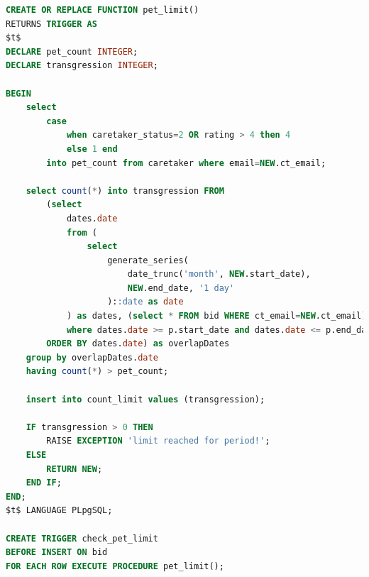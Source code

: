 \documentclass[
  paper=a4,
  ,captions=tableheading
]{scrartcl}
\begin{document}
\begin{lstlisting}[language=SQL]
CREATE OR REPLACE FUNCTION pet_limit()
RETURNS TRIGGER AS 
$t$
DECLARE pet_count INTEGER;
DECLARE transgression INTEGER;

BEGIN
    select 
        case 
            when caretaker_status=2 OR rating > 4 then 4
            else 1 end
        into pet_count from caretaker where email=NEW.ct_email;

    select count(*) into transgression FROM 
        (select
            dates.date
            from (
                select                                                                              
                    generate_series(
                        date_trunc('month', NEW.start_date),
                        NEW.end_date, '1 day'
                    )::date as date
            ) as dates, (select * FROM bid WHERE ct_email=NEW.ct_email) as p
            where dates.date >= p.start_date and dates.date <= p.end_date 
        ORDER BY dates.date) as overlapDates
    group by overlapDates.date
    having count(*) > pet_count;

    insert into count_limit values (transgression);

    IF transgression > 0 THEN
        RAISE EXCEPTION 'limit reached for period!';
    ELSE
        RETURN NEW;
    END IF;
END;
$t$ LANGUAGE PLpgSQL;

CREATE TRIGGER check_pet_limit
BEFORE INSERT ON bid
FOR EACH ROW EXECUTE PROCEDURE pet_limit();
\end{lstlisting}
\end{document}
